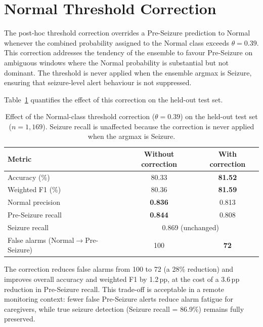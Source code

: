 \documentclass[12pt, a4paper]{report}
\begin{document}
\section{Normal Threshold Correction}
\label{sec:thresh_results}

The post-hoc threshold correction overrides a Pre-Seizure prediction to
Normal whenever the combined probability assigned to the Normal class
exceeds $\theta=0.39$. This correction addresses the tendency of the
ensemble to favour Pre-Seizure on ambiguous windows where the Normal
probability is substantial but not dominant. The threshold is never
applied when the ensemble argmax is Seizure, ensuring that seizure-level
alert behaviour is not suppressed.

Table~\ref{tab:threshold_comparison} quantifies the effect of this
correction on the held-out test set.

\begin{table}[H]
  \centering
  \caption{Effect of the Normal-class threshold correction
           ($\theta = 0.39$) on the held-out test set ($n = 1{,}169$).
           Seizure recall is unaffected because the correction is never
           applied when the argmax is Seizure.}
  \label{tab:threshold_comparison}
  \small
  \renewcommand{\arraystretch}{1.2}
  \begin{tabular}{lcc}
    \toprule
    \textbf{Metric} & \textbf{Without correction} & \textbf{With correction} \\
    \midrule
    Accuracy (\%)           & 80.33 & \textbf{81.52} \\
    Weighted F1 (\%)        & 80.36 & \textbf{81.59} \\
    Normal precision        & \textbf{0.836}  & 0.813  \\
    Pre-Seizure recall      & \textbf{0.844}  & 0.808  \\
    Seizure recall          & \multicolumn{2}{c}{0.869 (unchanged)} \\
    False alarms (Normal$\to$Pre-Seizure) & 100 & \textbf{72} \\
    \bottomrule
  \end{tabular}
\end{table}

The correction reduces false alarms from 100 to 72 (a 28\% reduction)
and improves overall accuracy and weighted F1 by 1.2\,pp, at the cost of
a 3.6\,pp reduction in Pre-Seizure recall. This trade-off is acceptable
in a remote monitoring context: fewer false Pre-Seizure alerts reduce
alarm fatigue for caregivers, while true seizure detection
(Seizure recall = 86.9\%) remains fully preserved.
\end{document}
